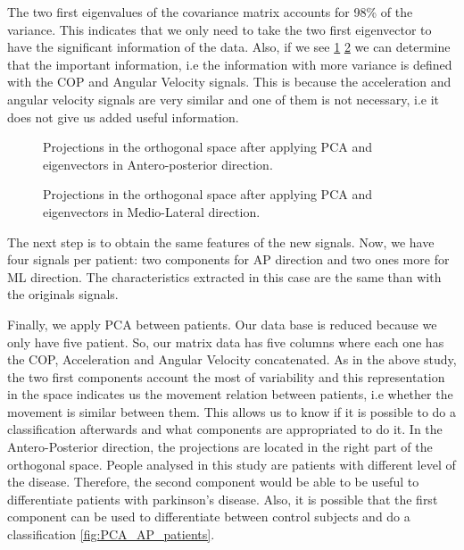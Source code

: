 The two first eigenvalues of the covariance matrix accounts for 98\% of the variance. This indicates that we only need to take the two first eigenvector to have the significant information of the data. Also, if we see \ref{fig:PCA_AP} \ref{fig:PCA_ML}  we can determine that the important information, i.e the information with more variance is defined with the COP and Angular Velocity signals. This is because the acceleration and angular velocity signals are very similar and one of them is not necessary, i.e it does not give us added useful information.
\begin{figure}[H]
	\centering
	\caption{Projections in the orthogonal space after applying PCA and eigenvectors in Antero-posterior direction.}
	\label{fig:PCA_AP}
\end{figure}

\begin{figure}[H]
	\centering
	\caption{Projections in the orthogonal space after applying PCA and eigenvectors in Medio-Lateral direction.}
	\label{fig:PCA_ML}
\end{figure}

The next step is to obtain the same features of the new signals. Now, we have four signals per patient: two components for AP direction and two ones more for ML direction. The characteristics extracted in this case are the same than with the originals signals.

Finally, we apply PCA between patients. Our data base is reduced because we only have five patient. So, our matrix data has five columns where each one has the COP, Acceleration and Angular Velocity concatenated. As in the above study, the two first components account the most of variability and this representation in the space indicates us the movement relation between patients, i.e whether the movement is similar between them. This allows us to know if it is possible to do a classification afterwards and what components are appropriated to do it.
In the Antero-Posterior direction, the projections are located in the right part of the orthogonal space. People analysed in this study are patients with different level of the disease. Therefore, the second component would be able to be useful to differentiate patients with parkinson’s disease. Also, it is possible that the first component can be used to differentiate between control subjects and do a classification \ref{fig:PCA_AP_patients}.

